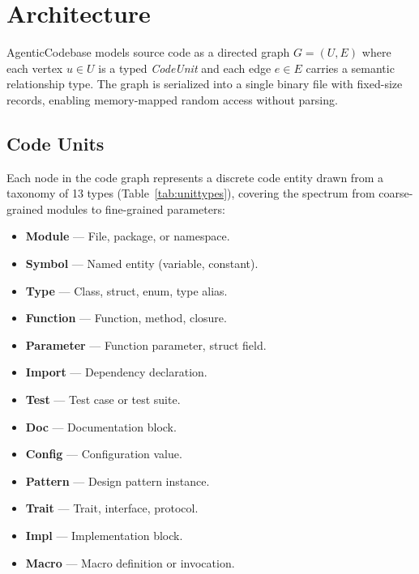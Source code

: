 \documentclass[10pt, twocolumn]{article}
\begin{document}
\section{Architecture}
\label{sec:architecture}

AgenticCodebase models source code as a directed graph $G = (U, E)$ where each vertex $u \in U$ is a typed \emph{CodeUnit} and each edge $e \in E$ carries a semantic relationship type. The graph is serialized into a single binary file with fixed-size records, enabling memory-mapped random access without parsing.

\subsection{Code Units}
\label{sec:units}

Each node in the code graph represents a discrete code entity drawn from a taxonomy of 13 types (Table~\ref{tab:unittypes}), covering the spectrum from coarse-grained modules to fine-grained parameters:

\begin{itemize}[nosep, leftmargin=*]
  \item \textbf{Module} --- File, package, or namespace.
  \item \textbf{Symbol} --- Named entity (variable, constant).
  \item \textbf{Type} --- Class, struct, enum, type alias.
  \item \textbf{Function} --- Function, method, closure.
  \item \textbf{Parameter} --- Function parameter, struct field.
  \item \textbf{Import} --- Dependency declaration.
  \item \textbf{Test} --- Test case or test suite.
  \item \textbf{Doc} --- Documentation block.
  \item \textbf{Config} --- Configuration value.
  \item \textbf{Pattern} --- Design pattern instance.
  \item \textbf{Trait} --- Trait, interface, protocol.
  \item \textbf{Impl} --- Implementation block.
  \item \textbf{Macro} --- Macro definition or invocation.
\end{itemize}
\end{document}
